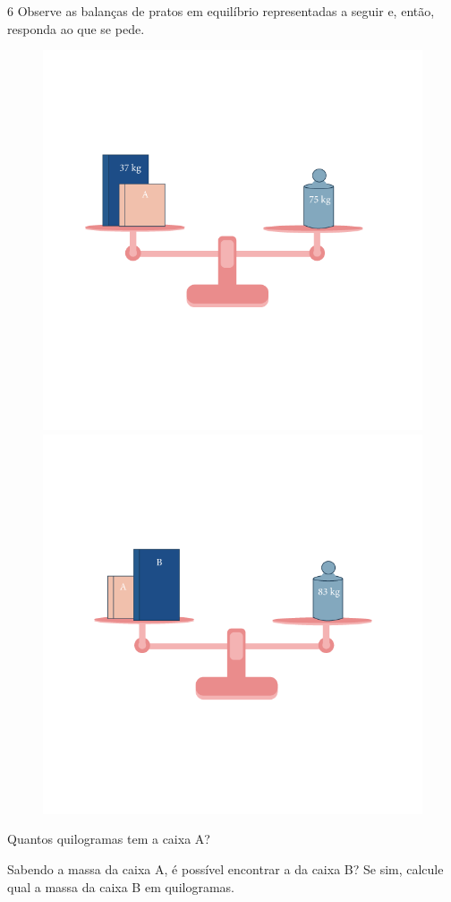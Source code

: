 \num{6} Observe as balanças de pratos em equilíbrio representadas a seguir e, então, responda ao que se pede.

\begin{figure}[htpb!]
\includegraphics[width=.5\textwidth]{../ilustracoes/MAT5/SAEB_5ANO_MAT_figura20a.png}
\includegraphics[width=.5\textwidth]{../ilustracoes/MAT5/SAEB_5ANO_MAT_figura20b.png}
\end{figure}

\begin{escolha}
\item Quantos quilogramas tem a caixa A?



\item Sabendo a massa da caixa A, é possível encontrar a da caixa B? Se sim,
  calcule qual a massa da caixa B em quilogramas.


\end{escolha}

